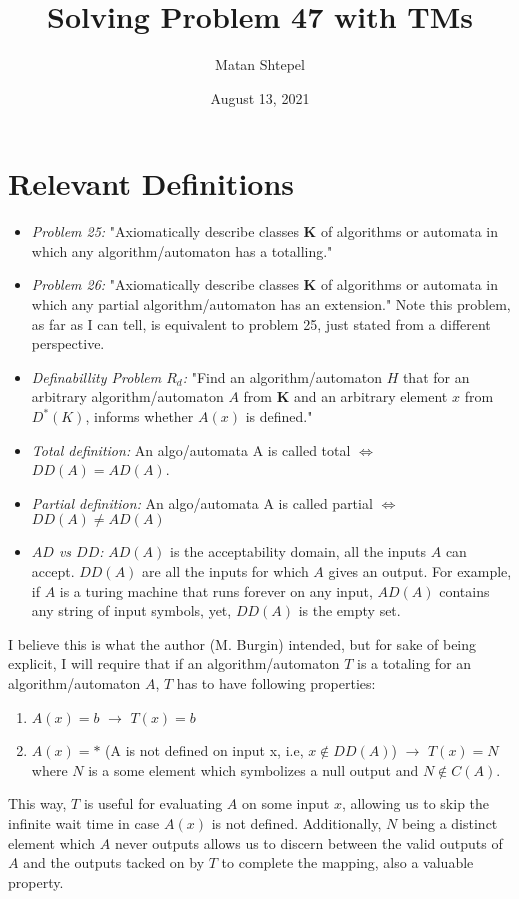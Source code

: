 \documentclass{article}
\title{Solving Problem 47 with TMs}
\author{Matan Shtepel}
\date{August 13, 2021}
\newcommand{\titem}[1]{\item{}\textit{#1}} %
\newcommand{\K}{$\bm{K}$}
\newcommand{\aaa}{algorithm/automaton}
\begin{document}
\maketitle

\section{Relevant Definitions}
\begin{itemize}
    \titem{Problem 25:} "Axiomatically describe classes \K{} of algorithms or automata in which any algorithm/automaton has a totalling."
    \titem{Problem 26:} "Axiomatically describe classes \K{} of algorithms or automata in which any partial algorithm/automaton has an extension." Note this problem, as far as I can tell, is equivalent to problem 25, just stated from a different perspective. 
    \titem{Definabillity Problem $R_d$:} "Find an algorithm/automaton $H$ that for an arbitrary algorithm/automaton $A$ from \K{} and an arbitrary element $x$ from $D^*(K)$, informs whether $A(x)$ is defined."
    \titem{Total definition:} An algo/automata A is called total $\iff$ $DD(A)=AD(A)$.
    \titem{Partial definition:} An algo/automata A is called partial $\iff$ $DD(A)\neq{}AD(A)$
    \titem{$AD$ vs $DD$:} $AD(A)$ is the acceptability domain, all the inputs $A$ can accept. $DD(A)$ are all the inputs for which $A$ gives an output. For example, if $A$ is a turing machine that runs forever on any input, $AD(A)$ contains any string of input symbols, yet, $DD(A)$ is the empty set.   
\end{itemize}
I believe this is what the author (M. Burgin) intended, but for sake of being explicit, I will require that if an \aaa{} $T$ is a totaling for an \aaa{} $A$, $T$ has to have following properties:
\begin{enumerate}
    \item $A(x)=b$ $\rightarrow{}$ $T(x)=b$
    \item $A(x)=*$ (A is not defined on input x, i.e, $x\notin{}DD(A)$) $\rightarrow{}$ $T(x)=N$ where $N$ is a some element which symbolizes a null output and $N\notin{}C(A)$.
\end{enumerate}
This way, $T$ is useful for evaluating $A$ on some input $x$, allowing us to skip the infinite wait time in case $A(x)$ is not defined. Additionally, $N$ being a distinct element which $A$ never outputs allows us to discern between the valid outputs of $A$ and the outputs tacked on by $T$ to complete the mapping, also a valuable property. 
    
\end{document}
